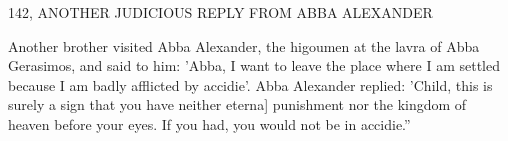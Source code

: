 142, ANOTHER JUDICIOUS REPLY
FROM ABBA ALEXANDER

Another brother visited Abba Alexander, the higoumen at the lavra
of Abba Gerasimos, and said to him: 'Abba, I want to leave the
place where I am settled because I am badly afflicted by accidie'.
Abba Alexander replied: 'Child, this is surely a sign that you have
neither eterna] punishment nor the kingdom of heaven before your
eyes. If you had, you would not be in accidie.”

